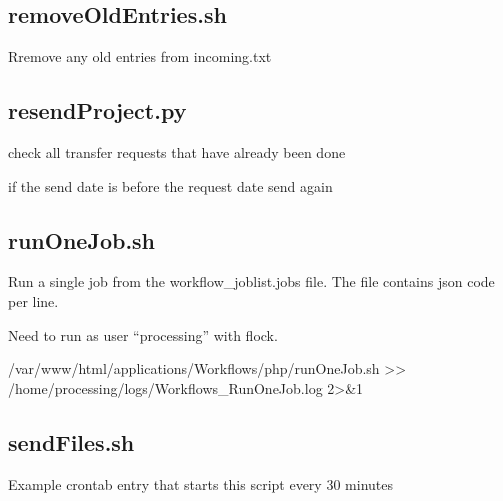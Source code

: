 \documentclass[letterpaper,10pt,english]{sphinxmanual}
\begin{document}
\sphinxstepscope


\subsection{removeOldEntries.sh}
\label{\detokenize{Architecture/scripts/removeOldEntries:removeoldentries-sh}}\label{\detokenize{Architecture/scripts/removeOldEntries::doc}}
\sphinxAtStartPar
Rremove any old entries from incoming.txt

\sphinxstepscope


\subsection{resendProject.py}
\label{\detokenize{Architecture/scripts/resendProject:resendproject-py}}\label{\detokenize{Architecture/scripts/resendProject::doc}}
\sphinxAtStartPar
check all transfer requests that have already been done

\sphinxAtStartPar
if the send date is before the request date send again

\sphinxstepscope


\subsection{runOneJob.sh}
\label{\detokenize{Architecture/scripts/runOneJob:runonejob-sh}}\label{\detokenize{Architecture/scripts/runOneJob::doc}}
\sphinxAtStartPar
Run a single job from the workflow\_joblist.jobs file. The file contains json code per line.

\sphinxAtStartPar
Need to run as user “processing” with flock.
\begin{description}
\begin{description}
\sphinxAtStartPar
/var/www/html/applications/Workflows/php/runOneJob.sh \textgreater{}\textgreater{} /home/processing/logs/Workflows\_RunOneJob.log 2\textgreater{}\&1

\end{description}

\end{description}

\sphinxstepscope


\subsection{sendFiles.sh}
\label{\detokenize{Architecture/scripts/sendFiles:sendfiles-sh}}\label{\detokenize{Architecture/scripts/sendFiles::doc}}
\sphinxAtStartPar
Example crontab entry that starts this script every 30 minutes
\end{document}
